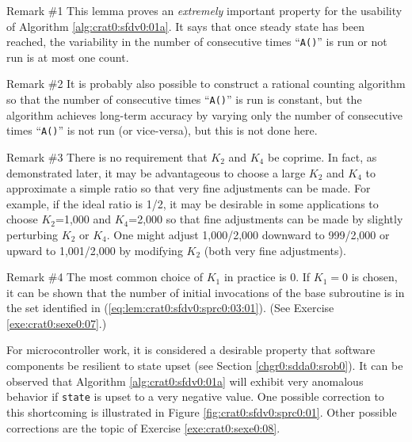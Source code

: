 \begin{vworklemmaparsection}{Remark \#1}
This lemma proves an \emph{extremely} important property for the
usability of Algorithm \ref{alg:crat0:sfdv0:01a}.  It says that once
steady state has been reached, the variability in the number of consecutive
times ``\texttt{A()}'' is run or not run is at most one count.
\end{vworklemmaparsection}
\begin{vworklemmaparsection}{Remark \#2}
It is probably also possible to construct a rational counting algorithm 
so that the number of consecutive times ``\texttt{A()}'' is run is constant,
but the algorithm achieves long-term accuracy by varying only the number
of consecutive times ``\texttt{A()}'' is not run (or vice-versa), but this
is not done here.
\end{vworklemmaparsection}
\begin{vworklemmaparsection}{Remark \#3}
There is no requirement that $K_2$ and $K_4$ be coprime.  In fact, as
demonstrated later, it may be advantageous to choose a large $K_2$ and 
$K_4$ to approximate a simple ratio so that very fine adjustments can be
made.  For example, if the ideal ratio is 1/2, it may be desirable 
in some applications to
choose $K_2$=1,000 and $K_4$=2,000 so that fine adjustments can be made
by slightly perturbing $K_2$ or $K_4$.  One might adjust 1,000/2,000 downward
to 999/2,000 or upward to 1,001/2,000 by modifying $K_2$ 
(both very fine adjustments).
\end{vworklemmaparsection}
\begin{vworklemmaparsection}{Remark \#4}
The most common choice of $K_1$ in practice is 0.  If $K_1=0$ is chosen,
it can be shown that the number of initial invocations of the
base subroutine is in the set identified in 
(\ref{eq:lem:crat0:sfdv0:sprc0:03:01}).
(See Exercise \ref{exe:crat0:sexe0:07}.)
\end{vworklemmaparsection}
\vworklemmafooter{}

For microcontroller work, it is considered
a desirable property that software components be resilient
to state upset 
(see Section \chgrzeroxrefhyphen\ref{chgr0:sdda0:srob0}).
It can be observed that Algorithm \ref{alg:crat0:sfdv0:01a} will
exhibit very anomalous behavior if \texttt{state} is upset to a very negative
value.  One possible correction to this shortcoming is illustrated
in Figure \ref{fig:crat0:sfdv0:sprc0:01}.  Other possible
corrections are the topic of Exercise \ref{exe:crat0:sexe0:08}.

